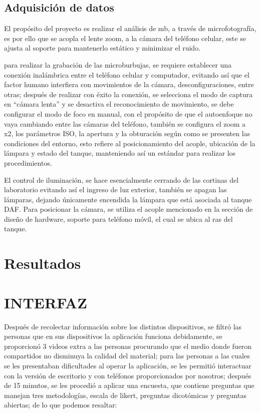 \documentclass[12pt,twocolumn,a4paper]{article}
\begin{document}
\subsection{Adquisición de datos}

El propósito del proyecto es realizar el análisis de mb, a través de microfotografía, es por ello que se acopla el lente zoom, a la cámara del teléfono celular, este se ajusta al soporte para mantenerlo estático y minimizar el ruido.

para realizar la grabación de las microburbujas, se requiere establecer una conexión inalámbrica entre el teléfono celular y computador, evitando así que el factor humano interfiera  con movimientos de la cámara, desconfiguraciones, entre otras; después de realizar con éxito la conexión,  se selecciona el modo de captura en “cámara lenta” y se desactiva el reconocimiento de movimiento, se debe configurar el modo de foco en manual, con el propósito de que el autoenfoque no vaya cambiando entre las cámaras del teléfono, también se configura el zoom a x2, los parámetros ISO, la apertura y la obturación según como se presenten las condiciones del entorno, esto refiere al posicionamiento del acople, ubicación de la lámpara y estado del tanque, manteniendo así un estándar para realizar los procedimientos.

El control de iluminación, se hace esencialmente cerrando de las cortinas del laboratorio evitando así el ingreso de luz exterior, también se apagan las lámparas, dejando únicamente encendida la lámpara que está asociada al tanque DAF. Para posicionar la cámara, 
se utiliza el acople mencionado en la sección de diseño de hardware, soporte para teléfono móvil, el cual se ubica al ras del tanque.



\section{Resultados}

\section{INTERFAZ}

Después de recolectar información sobre los distintos dispositivos, se filtró las personas que en sus dispositivos la aplicación funciona debidamente, se proporcionó 3 videos extra a  las personas procurando que el medio donde fueron compartidos no disminuya la calidad del material; para las personas a las cuales se les presentaban dificultades al operar la aplicación, se les permitió interactuar con la versión de escritorio y con teléfonos proporcionados por nosotros; después de  15 minutos, se les procedió a aplicar una encuesta, que contiene preguntas  que manejan tres metodologías, escala de likert, preguntas dicotómicas y preguntas abiertas; de lo que podemos resaltar:
\end{document}

